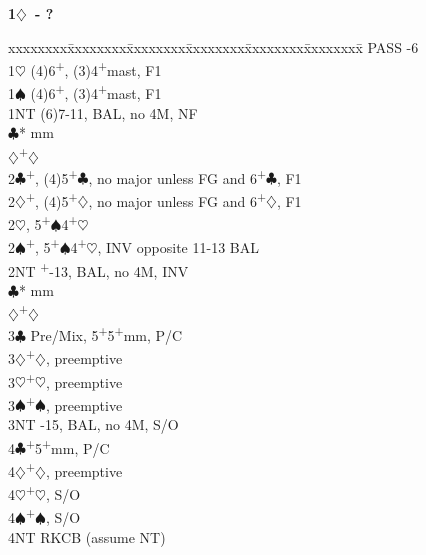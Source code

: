 \documentclass[10pt]{article}
\renewcommand{\c}{$\clubsuit$}
\renewcommand{\d}{$\diamondsuit$}
\newcommand{\h}{$\heartsuit$}
\newcommand{\s}{$\spadesuit$}
\newcommand{\p}{\textsuperscript{+}}
\newcommand{\m}{\textsuperscript{\textminus}}
\newcommand{\x}{DBL}
\newenvironment{bidtable}[1][]
{\textbf{#1}
  \begin{adjustwidth}{1em}{}
    \addvspace{2pt}
    \begin{tabbing}
      xxxxxxxx\=xxxxxxxx\=xxxxxxxx\=xxxxxxxx\=xxxxxxxx\=xxxxxxxx\=\kill}
{\end{tabbing}\end{adjustwidth}\bigskip}%
\begin{document}
\begin{multicols*}{2}
\begin{bidtable}[1\d\ - ?]
PASS      -6                                              \\
1\h       \> (4)6\p , (3)4\p mast, F1                         \\
1\s       \> (4)6\p , (3)4\p mast, F1                         \\
1NT       \> (6)7-11\m, BAL, no 4M, NF                        \\
          \c* {} mm                                    \\
          \d  {}\p\d                                    \\
2\c       {}\p, (4)5\p\c, no major unless FG and 6\p\c, F1 \\
2\d       {}\p, (4)5\p\d, no major unless FG and 6\p\d, F1 \\
2\h       {}\m, 5\p\s 4\p\h                               \\
2\s       {}\p, 5\p\s 4\p\h, INV opposite 11-13 BAL        \\
2NT       \p-13, BAL, no 4M, INV                         \\
          \c* {} mm                                    \\
          \d  {}\p\d                                    \\
3\c       \> Pre/Mix, 5\p 5\p mm, P/C                         \\
3\d       {}\p\d, preemptive                                \\
3\h       {}\p\h, preemptive                                \\
3\s       {}\p\s, preemptive                                \\
3NT       -15, BAL, no 4M, S/O                           \\
4\c       {}\p 5\p mm, P/C                                  \\
4\d       {}\p\d, preemptive                                \\
4\h       {}\p\h, S/O                                       \\
4\s       {}\p\s, S/O                                       \\
4NT       \> RKCB (assume NT)

\end{bidtable}
\end{multicols*}
\end{document}
